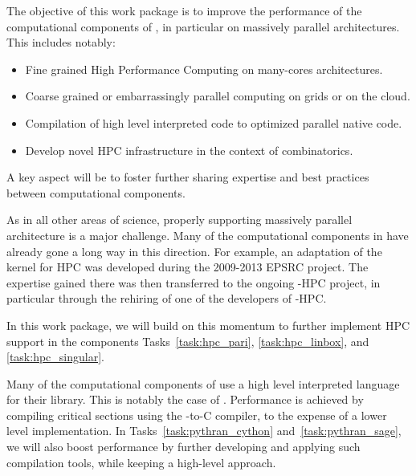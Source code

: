 \addtocounter{wpno}{1}
\begin{Workpackage}{\thewpno}
\label{wp:hpc}
\WPTitle{\wpname{\thewpno}}

\begin{WPObjectives}
  The objective of this work package is to improve the performance of
  the computational components of \TheProject, in particular on
  massively parallel architectures. This includes notably:
  \begin{itemize}
  \item Fine grained High Performance Computing on many-cores
    architectures.
  \item Coarse grained or embarrassingly parallel computing on grids
    or on the cloud.
  \item Compilation of high level interpreted code to optimized
    parallel native code.
  \item Develop novel HPC infrastructure in the context of
    combinatorics.
  \end{itemize}
  A key aspect will be to foster further sharing expertise and best
  practices between computational components.
\end{WPObjectives}

\begin{WPDescription}
  As in all other areas of science, properly supporting massively
  parallel architecture is a major challenge. Many of the
  computational components in \TheProject have already gone a long way
  in this direction. For example, an adaptation of the \GAP kernel for
  HPC was developed during the 2009-2013 EPSRC project. The expertise
  gained there was then transferred to the ongoing \Singular-HPC
  project, in particular through the rehiring of one of the developers
  of \GAP-HPC.

  In this work package, we will build on this momentum to further
  implement HPC support in the components Tasks~\ref{task:hpc_pari},
  \ref{task:hpc_linbox}, and \ref{task:hpc_singular}.


  Many of the computational components of \TheProject use a high level
  interpreted language for their library. This is notably the case of
  \Sage. Performance is achieved by compiling critical sections using
  the \Cython \Python-to-C compiler, to the expense of a lower level
  implementation. In Tasks~\ref{task:pythran_cython}
  and~\ref{task:pythran_sage}, we will also boost performance by
  further developing and applying such compilation tools, while
  keeping a high-level approach.


\end{WPDescription}
\end{Workpackage}
